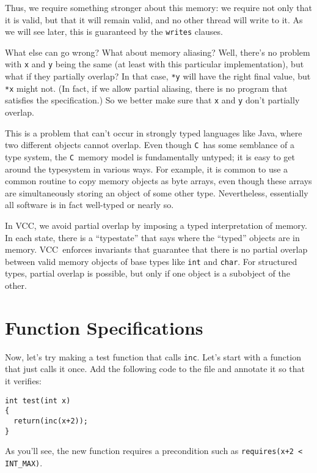 \documentclass{report}
\newcommand{\Q}[1]{\lstinline~#1~}
\newcommand{\C}{\Q{C}}
\newcommand{\VCC}{VCC}
\begin{document}
Thus, we require something stronger about this memory: we require not
only that it is valid, but that it will remain valid, and no other
thread will write to it. As we will see later, this is guaranteed by the 
\Q{writes} clauses. 

What else can go wrong? What about memory aliasing? Well, there's no
problem with \Q{x} and \Q{y} being the same (at least with this
particular implementation), but what if they partially overlap? In
that case, \Q{*y} will have the right final value, but \Q{*x} might
not. (In fact, if we allow partial aliasing, there is no program that
satisfies the specification.) So we better make sure that \Q{x} and
\Q{y} don't partially overlap.

This is a problem that can't occur in strongly typed languages like
Java, where two different objects cannot overlap.  
Even though \C\ has some semblance of a type system, the \C\ memory
model is fundamentally untyped; it is easy to get around the
typesystem in various ways.  For example, it is common to use a common
routine to copy memory objects as byte arrays, even though these
arrays are simultaneously storing an object of some other type.
Nevertheless, essentially all software is in fact well-typed or nearly
so. 

In \VCC, we avoid partial overlap by imposing a typed interpretation
of memory.  In each state, there is a ``typestate'' that says where
the ``typed'' objects are in memory. \VCC\ enforces invariants that
guarantee that there is no partial overlap between valid memory
objects of base types like \Q{int} and \Q{char}. For structured types,
partial overlap is possible, but only if one object is a subobject of
the other.


\chapter{Function Specifications}

Now, let's try making a test function that calls \Q{inc}. Let's start with
a function that just calls it once. Add the following code to the file
and annotate it so that it verifies:
\begin{lstlisting}
int test(int x)
{
  return(inc(x+2));
}
\end{lstlisting}
As you'll see, the new function requires a precondition such as
\Q{requires(x+2 < INT_MAX)}.
\end{document}
